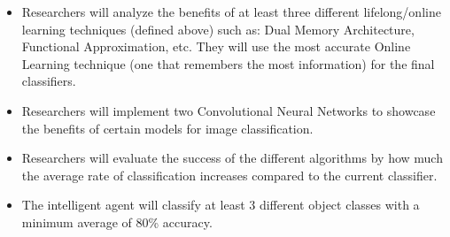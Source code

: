 \documentclass[draftclsnofoot, onecolumn, 10pt, compsoc]{IEEEtran}
\begin{document}
\begin{itemize}
\begin{itemize}
				\begin{itemize}
					\item Researchers will analyze the benefits of at least three different lifelong/online learning techniques (defined above) such as: Dual Memory Architecture, Functional Approximation, etc. They will use the most accurate Online Learning technique (one that remembers the most information) for the final classifiers.
					\item Researchers will implement two Convolutional Neural Networks to showcase the benefits of certain models for image classification. 
					\item Researchers will evaluate the success of the different algorithms by how much the average rate of classification increases compared to the current classifier.
					\item The intelligent agent will classify at least 3 different object classes with a minimum average of 80\% accuracy. 
				\end{itemize}
		\end{itemize}
	\end{itemize}
\end{document}
